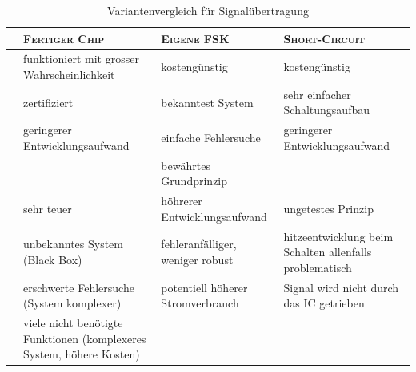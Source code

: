 \begin{table}[h!]
    \centering
    \small
    \caption{Variantenvergleich f\"ur Signal\"ubertragung}
    \label{tab:signalvariants}
    \begin{tabular}{
        >{\raggedright}p{6mm}|
        >{\raggedright}p{40mm}
        >{\raggedright}p{40mm}
        >{\raggedright\arraybackslash}p{40mm}}

        \toprule
        & \textsc{Fertiger Chip}
        & \textsc{Eigene FSK}
        & \textsc{Short-Circuit}
        \\
        \midrule
        & funktioniert mit grosser Wahrscheinlichkeit
        & kosteng\"unstig
        & kosteng\"unstig
        \\

        \rowcolor{black!10}
        \cellcolor{white}
        & zertifiziert
        & bekanntest System
        & sehr einfacher Schaltungsaufbau
        \\

        & geringerer Entwicklungsaufwand
        & einfache Fehlersuche
        & geringerer Entwicklungsaufwand
        \\


        \rowcolor{black!10}
        \parbox[t]{1em}{}
        &
        & bew\"ahrtes Grundprinzip
        &
        \\

        \midrule
        & sehr teuer
        & h\"ohrerer Entwicklungsaufwand
        & ungetestes Prinzip
        \\

        & unbekanntes System (Black Box)
        & fehleranf\"alliger, weniger robust
        & hitzeentwicklung beim Schalten allenfalls problematisch
        \\

        & erschwerte Fehlersuche (System komplexer)
        & potentiell h\"oherer Stromverbrauch
        & Signal wird nicht durch das IC getrieben
        \\


        \parbox[t]{1em}{}
        & viele nicht ben\"otigte Funktionen (komplexeres System, h\"ohere Kosten)
        &
        &
        \\

        \bottomrule
    \end{tabular}
\end{table}
